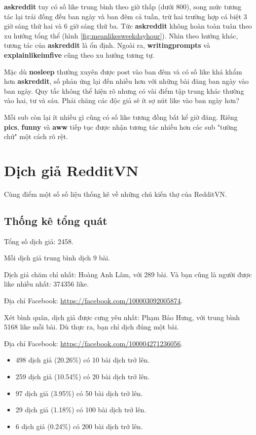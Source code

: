 \documentclass[10pt,a4paper]{article}
\begin{document}
\textbf{askreddit} tuy có số like trung bình theo giờ thấp (dưới 800), song mức tương tác lại trải đồng đều ban ngày và ban đêm cả tuần, trừ hai trường hợp cá biệt 3 giờ sáng thứ hai và 6 giờ sáng thứ ba. Tức \textbf{askreddit} không hoàn toàn tuân theo xu hướng tổng thể (hình \eqref{fig:meanlikesweekdayhour}). Nhìn theo hướng khác, tương tác của \textbf{askreddit} là ổn định. Ngoài ra, \textbf{writingprompts} và \textbf{explainlikeimfive} cũng theo xu hướng tương tự.

Mặc dù \textbf{nosleep} thường xuyên được post vào ban đêm và có số like khá khẩm hơn \textbf{askreddit}, số phản ứng lại đến nhiều hơn với những bài đăng ban ngày vào ban ngày. Quy tắc không thể hiện rõ nhưng có vài điểm tập trung khác thường vào hai, tư và sáu. Phải chăng các độc giả sẽ ít sợ nút like vào ban ngày hơn?

Mỗi sub còn lại ít nhiều gì cũng có số like tương đồng bất kể giờ đăng. Riêng \textbf{pics}, \textbf{funny} và \textbf{aww} tiếp tục được nhận tương tác nhiều hơn các sub "tường chữ" một cách rõ rệt.

\section{Dịch giả RedditVN}
Cùng điểm một số số liệu thống kê về những chú kiến thợ của RedditVN.
\subsection{Thống kê tổng quát}
Tổng số dịch giả: 2458.

Mỗi dịch giả trung bình dịch 9 bài.

Dịch giả chăm chỉ nhất: Hoàng Anh Lâm, với 289 bài. Và bạn cũng là người được like nhiều nhất: 374356 like.

Địa chỉ Facebook: \href{https://facebook.com/100003092005874}{https://facebook.com/100003092005874}.

Xét bình quân, dịch giả được cưng yêu nhất: Phạm Bảo Hưng, với trung bình 5168 like mỗi bài. Dù thực ra, bạn chỉ dịch đúng một bài.

Địa chỉ Facebook: \href{https://facebook.com/100004271236056}{https://facebook.com/100004271236056}.

\begin{itemize}
    \item 498 dịch giả (20.26\%) có 10 bài dịch trở lên.
    \item 259 dịch giả (10.54\%) có 20 bài dịch trở lên.
    \item 97 dịch giả (3.95\%) có 50 bài dịch trở lên.
    \item 29 dịch giả (1.18\%) có 100 bài dịch trở lên.
    \item 6 dịch giả (0.24\%) có 200 bài dịch trở lên.
\end{itemize}
\end{document}
